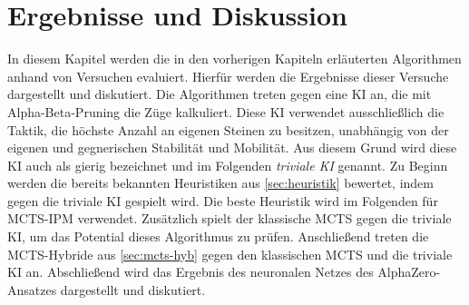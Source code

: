 \documentclass[12pt,a4paper,bibliography=totocnumbered,listof=totocnumbered]{article}
\begin{document}

\pagebreak
\section{Ergebnisse und Diskussion}
In diesem Kapitel werden die in den vorherigen Kapiteln erläuterten Algorithmen anhand von Versuchen evaluiert. Hierfür werden die Ergebnisse dieser Versuche dargestellt und diskutiert. Die Algorithmen treten gegen eine KI an, die mit Alpha-Beta-Pruning die Züge kalkuliert. Diese KI verwendet ausschließlich die Taktik, die höchste Anzahl an eigenen Steinen zu besitzen, unabhängig von der eigenen und gegnerischen Stabilität und Mobilität. Aus diesem Grund wird diese KI auch als gierig bezeichnet und im Folgenden \emph{triviale KI} genannt. Zu Beginn werden die bereits bekannten Heuristiken aus \autoref{sec:heuristik} bewertet, indem gegen die triviale KI gespielt wird. Die beste Heuristik wird im Folgenden für MCTS-IPM verwendet. Zusätzlich spielt der klassische MCTS gegen die triviale KI, um das Potential dieses Algorithmus zu prüfen. Anschließend treten die MCTS-Hybride aus \autoref{sec:mcts-hyb} gegen den klassischen MCTS und die triviale KI an. Abschließend wird das Ergebnis des neuronalen Netzes des AlphaZero-Ansatzes dargestellt und diskutiert.
\end{document}
